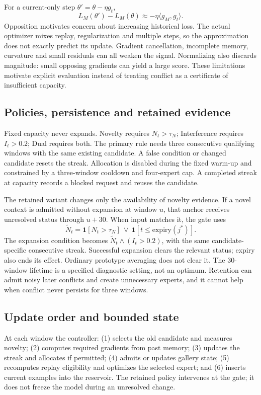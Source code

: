 For a current-only step \(\theta'=\theta-\eta g_t\),
\begin{equation}
L_M(\theta')-L_M(\theta)\approx-\eta\langle g_M,g_t\rangle.
\end{equation}
Opposition motivates concern about increasing historical loss. The actual optimizer mixes replay, regularization and multiple steps, so the approximation does not exactly predict its update. Gradient cancellation, incomplete memory, curvature and small residuals can all weaken the signal. Normalizing also discards magnitude: small opposing gradients can yield a large score. These limitations motivate explicit evaluation instead of treating conflict as a certificate of insufficient capacity.

\subsection{Policies, persistence and retained evidence}
Fixed capacity never expands. Novelty requires \(N_t>\tau_N\); Interference requires \(I_t>0.2\); Dual requires both. The primary rule needs three consecutive qualifying windows with the same existing candidate. A false condition or changed candidate resets the streak. Allocation is disabled during the fixed warm-up and constrained by a three-window cooldown and four-expert cap. A completed streak at capacity records a blocked request and reuses the candidate.

The retained variant changes only the availability of novelty evidence. If a novel context is admitted without expansion at window \(u\), that anchor receives unresolved status through \(u+30\). When input matches it, the gate uses
\begin{equation}
\widetilde N_t=\mathbf{1}[N_t>\tau_N]\ \lor\ \mathbf{1}[t\leq\mathrm{expiry}(j^*)].
\end{equation}
The expansion condition becomes \(\widetilde N_t\land(I_t>0.2)\), with the same candidate-specific consecutive streak. Successful expansion clears the relevant status; expiry also ends its effect. Ordinary prototype averaging does not clear it. The 30-window lifetime is a specified diagnostic setting, not an optimum. Retention can admit noisy later conflicts and create unnecessary experts, and it cannot help when conflict never persists for three windows.

\subsection{Update order and bounded state}
At each window the controller: (1) selects the old candidate and measures novelty; (2) computes required gradients from past memory; (3) updates the streak and allocates if permitted; (4) admits or updates gallery state; (5) recomputes replay eligibility and optimizes the selected expert; and (6) inserts current examples into the reservoir. The retained policy intervenes at the gate; it does not freeze the model during an unresolved change.

